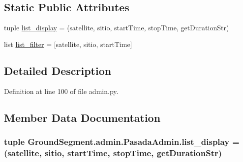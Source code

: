 \subsection*{Static Public Attributes}
\begin{DoxyCompactItemize}
\item 
tuple \hyperlink{class_ground_segment_1_1admin_1_1_pasada_admin_a720183fd0ad9d5f811d9034ec2ce1519}{list\+\_\+display} = (\textquotesingle{}satellite\textquotesingle{}, \textquotesingle{}sitio\textquotesingle{}, \textquotesingle{}start\+Time\textquotesingle{}, \textquotesingle{}stop\+Time\textquotesingle{}, \textquotesingle{}get\+Duration\+Str\textquotesingle{})
\item 
list \hyperlink{class_ground_segment_1_1admin_1_1_pasada_admin_a0d175d7e720a4cfe8be383bbd0050dd8}{list\+\_\+filter} = \mbox{[}\textquotesingle{}satellite\textquotesingle{}, \textquotesingle{}sitio\textquotesingle{}, \textquotesingle{}start\+Time\textquotesingle{}\mbox{]}
\end{DoxyCompactItemize}


\subsection{Detailed Description}


Definition at line 100 of file admin.\+py.



\subsection{Member Data Documentation}
\hypertarget{class_ground_segment_1_1admin_1_1_pasada_admin_a720183fd0ad9d5f811d9034ec2ce1519}{}
\subsubsection[{list\+\_\+display}]{\setlength{\rightskip}{0pt plus 5cm}tuple Ground\+Segment.\+admin.\+Pasada\+Admin.\+list\+\_\+display = (\textquotesingle{}satellite\textquotesingle{}, \textquotesingle{}sitio\textquotesingle{}, \textquotesingle{}start\+Time\textquotesingle{}, \textquotesingle{}stop\+Time\textquotesingle{}, \textquotesingle{}get\+Duration\+Str\textquotesingle{})\hspace{0.3cm}{\ttfamily [static]}}\label{class_ground_segment_1_1admin_1_1_pasada_admin_a720183fd0ad9d5f811d9034ec2ce1519}


